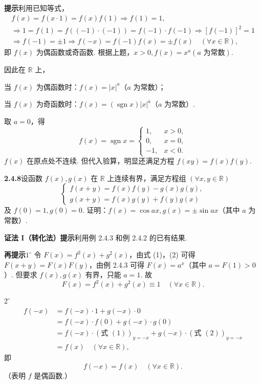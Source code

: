 \documentclass[UTF8, 12pt, fontset=fandol, oneside]{ctexart}
\begin{document}
\noindent\textbf{提示}\quad 利用已知等式，
\[
\begin{gathered}
f(x)=f(x\cdot1)=f(x)f(1)\Rightarrow f(1)=1,\\
\Rightarrow1=f(1)=f((-1)\cdot(-1))=f(-1)\cdot f(-1)\Rightarrow[f(-1)]^2=1\\
\Rightarrow f(-1)=\pm1\Rightarrow f(-x)=f(-1)f(x)=\pm f(x)\quad(\forall x\in\mathbb{R}),
\end{gathered}
\]
即 $f(x)$ 为偶函数或奇函数. 根据上题，$x>0,f(x)=x^a(a\text{ 为常数})$.

因此在 $\mathbb{R}$ 上，

当 $f(x)$ 为偶函数时：$f(x)=|x|^a$（$a$ 为常数）；

当 $f(x)$ 为奇函数时：$f(x)=(\operatorname{sgn} x)|x|^a$（$a$ 为常数）.

取 $a=0$，得
\[
  f(x)=\operatorname{sgn} x=
  \begin{cases}
    1, & x>0,\\
    0, & x=0,\\
    -1, & x<0.
  \end{cases}
\]
$f(x)$ 在原点处不连续. 但代入验算，明显还满足方程 $f(xy)=f(x)f(y)$.

\noindent\textbf{2.4.8}\quad 设函数 $f(x),g(x)$ 在 $\mathbb{R}$ 上连续有界，满足方程组 $(\forall x,y\in\mathbb{R})$
\[
\begin{cases}
f(x+y)=f(x)f(y)-g(x)g(y),\\
g(x+y)=f(x)g(y)+f(y)g(x)
\end{cases} \tag{1}
\]
及 $f(0)=1,g(0)=0$. 证明：$f(x)=\cos ax,g(x)=\pm\sin ax$（其中 $a$ 为常数）.

\noindent\textbf{证法 I（转化法）}\quad \textbf{提示}\quad 利用例 2.4.3 和例 2.4.2 的已有结果.

\noindent\textbf{再提示}\quad $1^\circ$ 令 $F(x)=f^2(x)+g^2(x)$，由式 (1)，(2) 可得 $F(x+y)=F(x)F(y)$，由例 2.4.3 可得 $F(x)=a^x$（其中 $a=F(1)>0$）. 但要求 $f(x),g(x)$ 有界，只能 $a=1$. 故
\[
  F(x)=f^2(x)+g^2(x)\equiv1\quad(\forall x\in\mathbb{R}). \tag{3}
\]

$2^\circ$
\[
\begin{aligned}
f(-x)
&=f(-x)\cdot1+g(-x)\cdot0\\
&=f(-x)\cdot f(0)+g(-x)\cdot g(0)\\
&=f(-x)\cdot(\text{式 }(1))_{y=-x}+g(-x)\cdot(\text{式 }(2))_{y=-x}\\
&=f(x)\quad(\forall x\in\mathbb{R}),
\end{aligned} \tag{4}
\]
即
\[
  f(-x)=f(x)\quad(\forall x\in\mathbb{R}).
\]
（表明 $f$ 是偶函数.）
\end{document}
